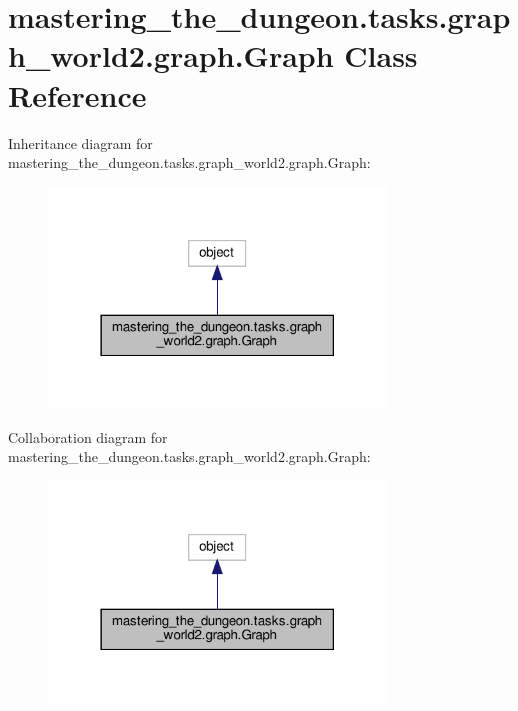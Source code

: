 \hypertarget{classmastering__the__dungeon_1_1tasks_1_1graph__world2_1_1graph_1_1Graph}{}\section{mastering\+\_\+the\+\_\+dungeon.\+tasks.\+graph\+\_\+world2.\+graph.\+Graph Class Reference}
\label{classmastering__the__dungeon_1_1tasks_1_1graph__world2_1_1graph_1_1Graph}


Inheritance diagram for mastering\+\_\+the\+\_\+dungeon.\+tasks.\+graph\+\_\+world2.\+graph.\+Graph\+:
\nopagebreak
\begin{figure}[H]
\begin{center}
\leavevmode
\includegraphics[width=254pt]{classmastering__the__dungeon_1_1tasks_1_1graph__world2_1_1graph_1_1Graph__inherit__graph}
\end{center}
\end{figure}


Collaboration diagram for mastering\+\_\+the\+\_\+dungeon.\+tasks.\+graph\+\_\+world2.\+graph.\+Graph\+:
\nopagebreak
\begin{figure}[H]
\begin{center}
\leavevmode
\includegraphics[width=254pt]{classmastering__the__dungeon_1_1tasks_1_1graph__world2_1_1graph_1_1Graph__coll__graph}
\end{center}
\end{figure}
